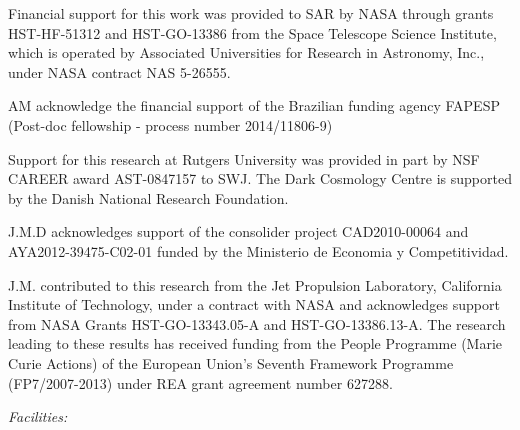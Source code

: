 Financial support for this work was provided to SAR by NASA through grants
HST-HF-51312 and HST-GO-13386 from the Space Telescope
Science Institute, which is operated by Associated Universities for
Research in Astronomy, Inc., under NASA contract NAS 5-26555.

AM acknowledge the financial support of the Brazilian funding agency
FAPESP (Post-doc fellowship - process number 2014/11806-9)

Support for this research at Rutgers University was provided in part
by NSF CAREER award AST-0847157 to SWJ.  The Dark Cosmology Centre is
supported by the Danish National Research Foundation.

J.M.D acknowledges support of the consolider project CAD2010-00064 and
AYA2012-39475-C02-01 funded by the Ministerio de Economia y
Competitividad.

J.M. contributed to this research from the Jet Propulsion Laboratory,
California Institute of Technology, under a contract with NASA and
acknowledges support from NASA Grants HST-GO-13343.05-A and
HST-GO-13386.13-A. The research leading to these results has received
funding from the People Programme (Marie Curie Actions) of the European
Union's Seventh Framework Programme (FP7/2007-­2013) under REA grant
agreement number 627288.

{\it Facilities:} 
\smallskip






